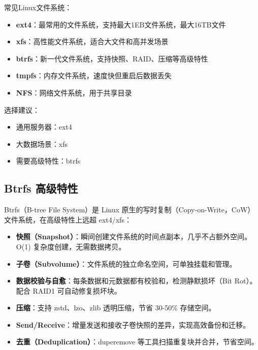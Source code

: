 \documentclass[12pt,UTF8]{ctexbook}
\begin{document}
常见Linux文件系统：

\begin{itemize}
    \item \textbf{ext4}：最常用的文件系统，支持最大1EB文件系统，最大16TB文件
    \item \textbf{xfs}：高性能文件系统，适合大文件和高并发场景
    \item \textbf{btrfs}：新一代文件系统，支持快照、RAID、压缩等高级特性
    \item \textbf{tmpfs}：内存文件系统，速度快但重启后数据丢失
    \item \textbf{NFS}：网络文件系统，用于共享目录
\end{itemize}

选择建议：
\begin{itemize}
    \item 通用服务器：ext4
    \item 大数据场景：xfs
    \item 需要高级特性：btrfs
\end{itemize}

\subsection*{Btrfs 高级特性}
Btrfs（B-tree File System）是 Linux 原生的写时复制（Copy-on-Write，CoW）文件系统，在高级特性上远超 ext4/xfs：

\begin{itemize}
    \item \textbf{快照（Snapshot）}：瞬间创建文件系统的时间点副本，几乎不占额外空间。O(1) 复杂度创建，无需数据拷贝。
    \item \textbf{子卷（Subvolume）}：文件系统的独立命名空间，可单独挂载和管理。
    \item \textbf{数据校验与自愈}：每条数据和元数据都有校验和，检测静默损坏（Bit Rot）。配合 RAID1 可自动修复损坏块。
    \item \textbf{压缩}：支持 zstd、lzo、zlib 透明压缩，节省 30-50\% 存储空间。
    \item \textbf{Send/Receive}：增量发送和接收子卷快照的差异，实现高效备份和迁移。
    \item \textbf{去重（Deduplication）}：duperemove 等工具扫描重复块并合并，节省空间。
\end{itemize}
\end{document}
